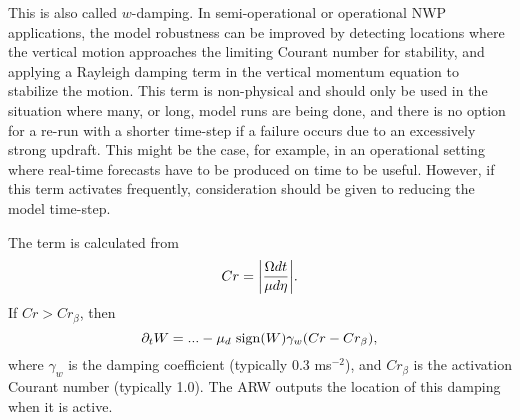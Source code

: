 This is also called $w$-damping.
In semi-operational or operational NWP applications,
the model robustness can be improved by detecting locations where the
vertical motion approaches the limiting Courant number for stability,
and applying a Rayleigh damping term in the vertical momentum equation to
stabilize the motion.  This term is non-physical and should
only be used in the situation where many, or long, model runs are being
done, and there is no option for a re-run with a shorter time-step if a 
failure occurs due to an excessively strong updraft. This might be the
case, for example, in an operational setting where real-time forecasts 
have to be produced on time to be useful. However, if this term activates
frequently, consideration should be given to reducing the model time-step.

The term is calculated from
%
\begin{equation}
Cr = \bigg | { \Omega dt \over \mu d\eta }\bigg |.
\notag
\end{equation}
%
\noindent
If $Cr > Cr_\beta$, then
\begin{equation}
\partial_t W = ... - \mu_d ~{\rm sign} (W) \gamma_w ( Cr - Cr_\beta ),
\notag
\end{equation}
%
\noindent 
where $\gamma_w$ is the damping coefficient 
(typically 0.3 ms$^{-2}$), and $Cr_\beta$ 
is the activation Courant number (typically 1.0).  The ARW outputs
the location of this damping when it is active.
